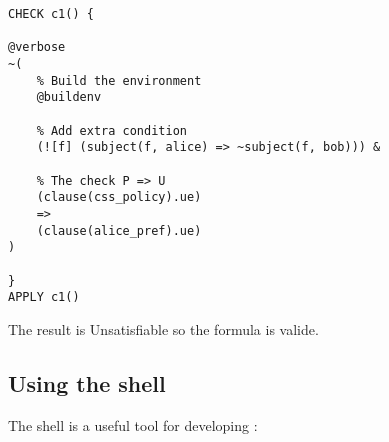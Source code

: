 \begin{lstlisting}
CHECK c1() {

@verbose
~(
    % Build the environment
    @buildenv

    % Add extra condition
    (![f] (subject(f, alice) => ~subject(f, bob))) &

    % The check P => U
    (clause(css_policy).ue)
    =>
    (clause(alice_pref).ue)
)

}
APPLY c1()
\end{lstlisting}
The result is Unsatisfiable so the formula is valide.

\subsection{Using the shell}
The shell is a useful tool for developing :

